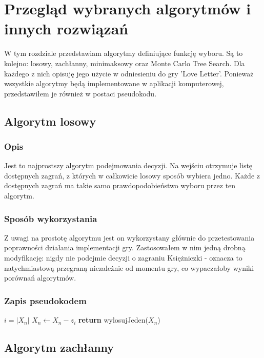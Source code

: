 \chapter{Przegląd wybranych algorytmów i innych rozwiązań}
\label{cha:rozdz3}

W tym rozdziale przedstawiam algorytmy definiujące funkcję wyboru. Są to kolejno: losowy, zachłanny, minimaksowy oraz Monte Carlo Tree Search. Dla każdego z nich opisuję jego użycie w odniesieniu do gry 'Love Letter'. Ponieważ wszystkie algorytmy będą implementowane w aplikacji komputerowej, przedstawiłem je również w postaci pseudokodu.

\section{Algorytm losowy}
\label{sec:algLos}
\subsection{Opis}
Jest to najprostszy algorytm podejmowania decyzji. Na wejściu otrzymuje listę dostępnych zagrań, z których w całkowicie losowy sposób wybiera jedno. Każde z dostępnych zagrań ma takie samo prawdopodobieństwo wyboru przez ten algorytm.

\subsection{Sposób wykorzystania}
Z uwagi na prostotę algorytmu jest on wykorzystany głównie do przetestowania poprawności działania implementacji gry. Zastosowałem w nim jedną drobną modyfikację: nigdy nie podejmie decyzji o zagraniu Księżniczki - oznacza to natychmiastową przegraną niezależnie od momentu gry, co wypaczałoby wyniki porównań algorytmów.

\subsection{Zapis pseudokodem}
\begin{algorithmic}[1]
		 \Comment $i = |X_n|$
				\State $X_n \gets X_n - z_i$
			\EndIf
		\EndFor
	\State \textbf{return} wylosujJeden($X_n$) 
	\EndFunction
\end{algorithmic}

\section{Algorytm zachłanny}
\label{sec:algZach}
